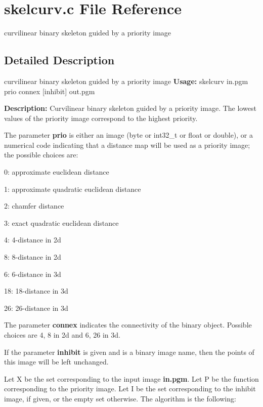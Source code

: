 \section{skelcurv.c File Reference}
\label{skelcurv_8c}


curvilinear binary skeleton guided by a priority image  




\subsection{Detailed Description}
curvilinear binary skeleton guided by a priority image {\bfseries Usage:} skelcurv in.pgm prio connex [inhibit] out.pgm

{\bfseries Description:} Curvilinear binary skeleton guided by a priority image. The lowest values of the priority image correspond to the highest priority.

The parameter {\bfseries prio} is either an image (byte or int32\_\-t or float or double), or a numerical code indicating that a distance map will be used as a priority image; the possible choices are: \begin{DoxyItemize}
\item 0: approximate euclidean distance \item 1: approximate quadratic euclidean distance \item 2: chamfer distance \item 3: exact quadratic euclidean distance \item 4: 4-\/distance in 2d \item 8: 8-\/distance in 2d \item 6: 6-\/distance in 3d \item 18: 18-\/distance in 3d \item 26: 26-\/distance in 3d\end{DoxyItemize}
The parameter {\bfseries connex} indicates the connectivity of the binary object. Possible choices are 4, 8 in 2d and 6, 26 in 3d.

If the parameter {\bfseries inhibit} is given and is a binary image name, then the points of this image will be left unchanged.

Let X be the set corresponding to the input image {\bfseries in.pgm}. Let P be the function corresponding to the priority image. Let I be the set corresponding to the inhibit image, if given, or the empty set otherwise. The algorithm is the following:

